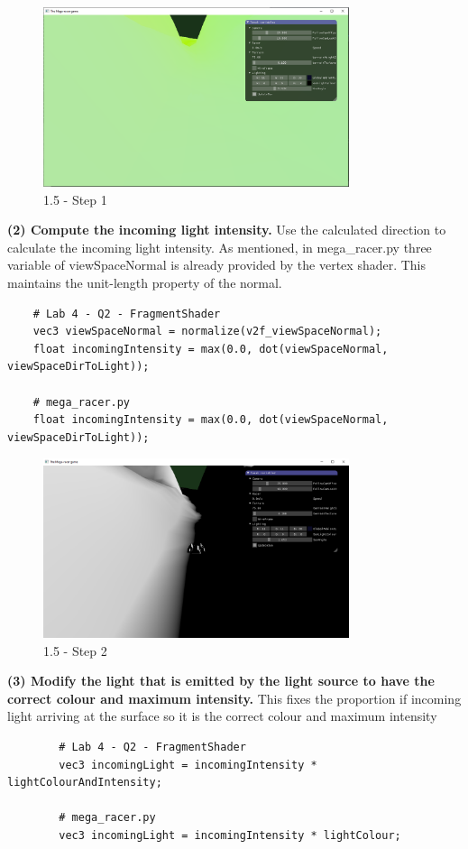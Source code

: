 \documentclass[a4 paper, 12pt]{article}
\begin{document}
    \begin{figure} [H]
        \centering
        \includegraphics[width=0.8\textwidth, frame]
            {./images/1.5_a.PNG}
        \caption{1.5 - Step 1}
    \end{figure}

\textbf{(2) Compute the incoming light intensity.}
Use the calculated direction to calculate the incoming light intensity. As mentioned, in mega\_racer.py three variable of viewSpaceNormal is already provided by the vertex shader. This maintains the unit-length property of the normal.
    \begin{lstlisting}
    # Lab 4 - Q2 - FragmentShader
    vec3 viewSpaceNormal = normalize(v2f_viewSpaceNormal);
    float incomingIntensity = max(0.0, dot(viewSpaceNormal, viewSpaceDirToLight));
 
    # mega_racer.py 
    float incomingIntensity = max(0.0, dot(viewSpaceNormal, viewSpaceDirToLight));
    \end{lstlisting}

    \begin{figure} [H]
        \centering
        \includegraphics[width=0.8\textwidth, frame]
            {./images/1.5_b.PNG}
        \caption{1.5 - Step 2}
    \end{figure}


\textbf{(3) Modify the light that is emitted by the light source to have the correct colour and maximum intensity.}
This fixes the proportion if incoming light arriving at the surface so it is the correct colour and maximum intensity
    \begin{lstlisting}
        # Lab 4 - Q2 - FragmentShader
        vec3 incomingLight = incomingIntensity * lightColourAndIntensity;

        # mega_racer.py
        vec3 incomingLight = incomingIntensity * lightColour;
    \end{lstlisting}
\end{document}
